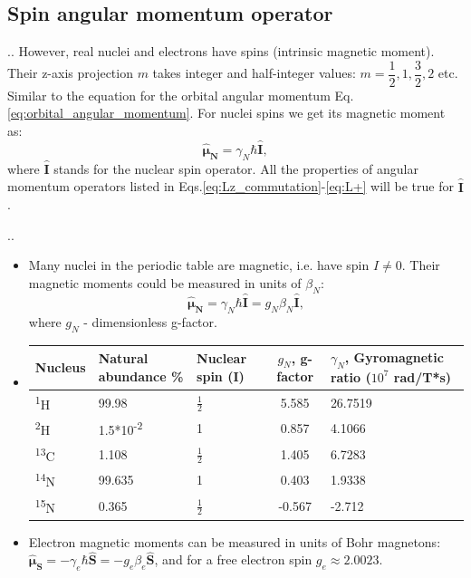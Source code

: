\documentclass{beamer}
\begin{document}
\subsection{Spin angular momentum operator}
\begin{frame}{\thesection.\thesubsection. \insertsubsection}
	However, real nuclei and electrons have spins (intrinsic magnetic moment). Their z-axis projection $m$ takes integer and half-integer values: $m=\dfrac{1}{2}, 1, \dfrac{3}{2}, 2$ etc. Similar to the equation for the orbital angular momentum Eq.\ref{eq:orbital_angular_momentum}. For nuclei spins we get its magnetic moment as:
	\begin{equation}
		\bm{\hat{\mu}_N} = \gamma_N \hbar \bm{\hat{I}},
	\end{equation}
	where $ \bm{\hat{I}}$ stands for the nuclear spin operator. All the properties of angular momentum operators listed in Eqs.\ref{eq:Lz_commutation}-\ref*{eq:L+} will be true for $ \bm{\hat{I}}$.
\end{frame}

\begin{frame}{\thesection.\thesubsection. \insertsubsection}
	\begin{itemize}[<+>]
		\item 	Many nuclei in the periodic table are magnetic, i.e. have spin $I \neq 0$. Their magnetic moments could be measured in units of $\beta_N$:
		\begin{equation}
		\bm{\hat{\mu}_N} = \gamma_N \hbar \bm{\hat{I}} = g_N \beta_N \bm{\hat{I}},
		\end{equation}
		where $g_N$ - dimensionless g-factor.
		\item
\begin{table}[ht]
	\centering
	\begin{tabular}{  C{1.0cm}  C{2.0cm}  C{1.0cm}  C{2.cm}  C{3cm}}
		\hline\hline
		Nucleus & Natural abundance \% & Nuclear spin (I) & $g_N$, g-factor & $\gamma_N$, Gyromagnetic ratio ($10^7$ rad/T*s) \\
		\hline
		\textsuperscript{1}H & 99.98 & $\frac{1}{2}$ & 5.585 & 26.7519 \\
		\textsuperscript{2}H & 1.5*10\textsuperscript{-2} & 1 & 0.857 & 4.1066 \\
		\textsuperscript{13}C & 1.108 & $\frac{1}{2}$ & 1.405 & 6.7283 \\
		\textsuperscript{14}N & 99.635 & 1 & 0.403 & 1.9338 \\
		\textsuperscript{15}N & 0.365 &  $\frac{1}{2}$ & -0.567 & -2.712 \\
		\hline
	\end{tabular}
	\label{tab:mag_properties}		
\end{table}
	\item
    Electron magnetic moments can be measured in units of Bohr magnetons: $\bm{\hat{\mu}_S} = -\gamma_e \hbar \bm{\hat{S}} = -g_e \beta_e \bm{\hat{S}}$, and for a free electron spin $g_e \approx 2.0023$.		
	\end{itemize}
\end{frame}
\end{document}
